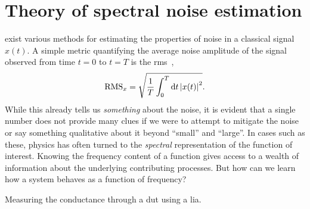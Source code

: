 \chapter{Theory of spectral noise estimation}\label{ch:speck:theory}
 exist various methods for estimating the properties of noise in a classical signal $x(t)$.
A simple metric quantifying the average noise amplitude of the signal observed from time $t=0$ to $t=T$ is the \gls{rms}~\cite{RMSMathworld},
\begin{align}\label{eq:speck:rms:timedomain}
    \operatorname{RMS}_x = \sqrt{\frac{1}{T}\int_{0}^{T}\dd{t}\abs{x(t)}^2}.
\end{align}
While this already tells us \emph{something} about the noise, it is evident that a single number does not provide many clues if we were to attempt to mitigate the noise or say something qualitative about it beyond \enquote{small} and \enquote{large}.
In cases such as these, physics has often turned to the \emph{spectral} representation of the function of interest.
Knowing the frequency content of a function gives access to a wealth of information about the underlying contributing processes.
But how can we learn how a system behaves as a function of frequency?

\begin{marginfigure}[*-6]
    \centering
    
    \caption{Measuring the conductance through a \gls{dut} using a \gls{lia}.}
    \label{fig:speck:theory:lockin_dut}
\end{marginfigure}

